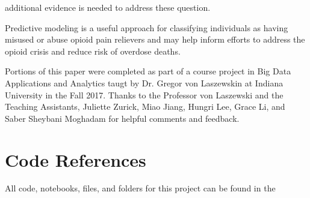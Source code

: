 \documentclass[sigconf]{acmart}
\begin{document}
additional evidence is needed to address these question. 

Predictive modeling is a useful approach for classifying individuals as 
having misused or abuse opioid pain relievers and may help inform 
efforts to address the opioid crisis and reduce risk of overdose deaths. 


\begin{acks}

Portions of this paper were completed as part of a course project in Big Data 
Applications and Analytics taugt by Dr. Gregor von Laszewskin at Indiana 
University in the Fall 2017. Thanks to the Professor von Laszewski and the
Teaching Assistants, Juliette Zurick, Miao Jiang, Hungri Lee, Grace Li, and 
Saber Sheybani Moghadam for helpful comments and feedback.

\end{acks}

 


\appendix

\section{Code References}
All code, notebooks, files, and folders for this project can be found in the



%
\end{document}
